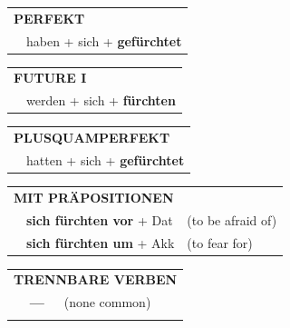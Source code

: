 \documentclass[10pt,a4paper]{revtex4-2}
\begin{document}
\begin{verbbox}
 \begin{tabular}{rl}
     \multicolumn{2}{l}{\textbf{PERFEKT}}\\
   & haben + sich + \textbf{gefürchtet}\\
  \end{tabular}
\hfill
   \begin{tabular}{rl}
    \multicolumn{2}{l}{\textbf{FUTURE I} }\\
   & werden + sich + \textbf{fürchten}\\
  \end{tabular}
\hfill
   \begin{tabular}{rl}
      \multicolumn{2}{l}{\textbf{PLUSQUAMPERFEKT}}\\
   & hatten + sich + \textbf{gefürchtet}\\
  \end{tabular}

   \vspace{10pt}

   \begin{tabular}{lll}
      \multicolumn{3}{l}{\textbf{MIT PRÄPOSITIONEN}}\\
& \textbf{sich fürchten vor} + Dat & (to be afraid of)\\
& \textbf{sich fürchten um} + Akk & (to fear for)\\
\end{tabular}
  \hfill
   \begin{tabular}{lll}
      \multicolumn{3}{l}{\textbf{TRENNBARE VERBEN}}\\
 & \textbf{---} & (none common)\\
\vspace{10pt}
  \end{tabular}

  \vspace{-5pt}

\end{verbbox}
\end{document}
